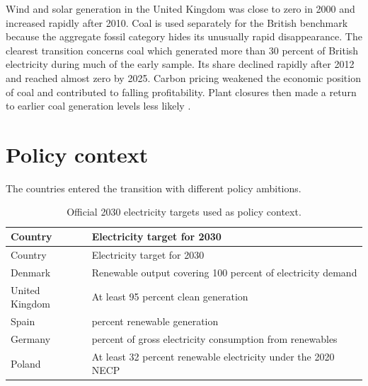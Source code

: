\documentclass[
]{krantz}
\begin{document}
Wind and solar generation in the United Kingdom was close to zero in 2000 and increased rapidly after 2010. Coal is used separately for the British benchmark because the aggregate fossil category hides its unusually rapid disappearance. The clearest transition concerns coal which generated more than 30 percent of British electricity during much of the early sample. Its share declined rapidly after 2012 and reached almost zero by 2025. Carbon pricing weakened the economic position of coal and contributed to falling profitability. Plant closures then made a return to earlier coal generation levels less likely \citep{sharpe2021}.

\section*{Policy context}\label{policy-context}


The countries entered the transition with different policy ambitions.

\begin{longtable}[]{@{}
  >{\raggedright\arraybackslash}p{}
  >{\raggedright\arraybackslash}p{}@{}}
\caption{\label{tab:ptp-policycontext} Official 2030 electricity targets used as policy context.}\tabularnewline
\toprule\noalign{}
\begin{minipage}[b]{\linewidth}\raggedright
Country
\end{minipage} & \begin{minipage}[b]{\linewidth}\raggedright
Electricity target for 2030
\end{minipage} \\
\midrule\noalign{}
\endfirsthead
\toprule\noalign{}
\begin{minipage}[b]{\linewidth}\raggedright
Country
\end{minipage} & \begin{minipage}[b]{\linewidth}\raggedright
Electricity target for 2030
\end{minipage} \\
\midrule\noalign{}
\endhead
\bottomrule\noalign{}
\endlastfoot
Denmark & Renewable output covering 100 percent of electricity demand \citep{denmark2026} \\
United Kingdom & At least 95 percent clean generation \citep{govuk2024} \\
Spain & 81 percent renewable generation \citep{miteco2024} \\
Germany & 80 percent of gross electricity consumption from renewables \citep{bmwk2026} \\
Poland & At least 32 percent renewable electricity under the 2020 NECP \citep{europeancommission2020} \\
\end{longtable}
\end{document}
